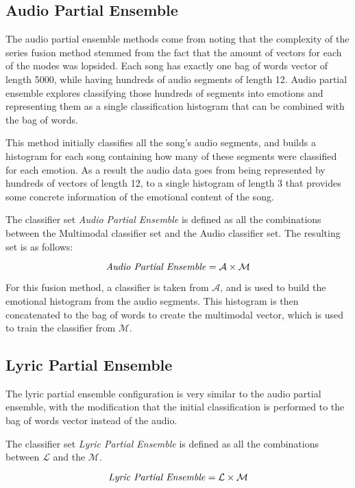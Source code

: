 \subsection*{Audio Partial Ensemble}

The audio partial ensemble methods come from noting that the complexity of the series fusion method stemmed from the 
fact that the amount of vectors for each of the modes was lopsided. Each song has exactly one bag of words vector of length 5000, while 
having hundreds of audio segments of length 12. Audio partial ensemble explores classifying those hundreds of segments into emotions and representing them as a single
classification histogram that can be combined with the bag of words. 

This method initially classifies all the song's audio segments, and builds a histogram
for each song containing how many of these segments were classified for each emotion. 
As a result the audio data goes from being represented by hundreds of
vectors of length 12, to a single histogram of length 3 that provides some concrete information of the emotional content of the song. 

The classifier set  \textit{Audio Partial Ensemble} is defined as all the combinations between the Multimodal classifier set and the Audio classifier set.  The resulting 
set is as follows: 

\[ \text{\textit{Audio Partial Ensemble}} = \mathcal{A} \times \mathcal{M}   \]

For this fusion method, a classifier is taken from $\mathcal{A}$, and is used to build the emotional histogram from the audio segments. This 
histogram is then concatenated to the bag of words to create the multimodal vector, which is used to train the classifier from $\mathcal{M}$.


\subsection*{Lyric Partial Ensemble}

The lyric partial ensemble configuration is very similar to the audio partial ensemble, with the modification that the initial classification is  
performed to the bag of words vector instead of the audio. 

The classifier set \textit{Lyric Partial Ensemble} is defined as all the combinations between  $\mathcal{L}$  and the  $\mathcal{M}$. 

\[ \text{\textit{Lyric Partial Ensemble}} = \mathcal{L} \times \mathcal{M}   \]



